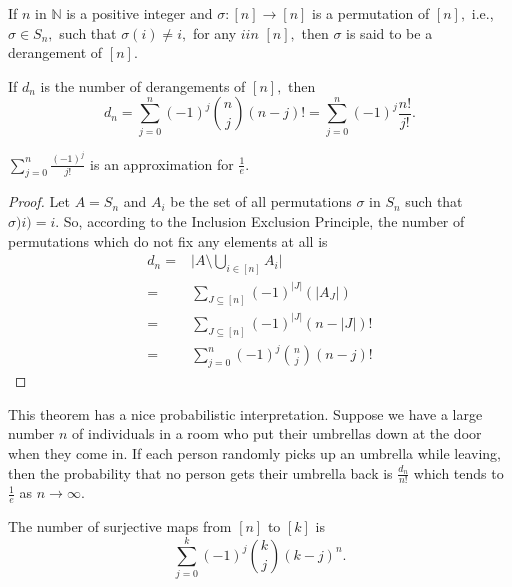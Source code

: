 
\begin{definition}[Derangements]
	If $n$ in $\mathbb{N}$ is a positive integer and $\sigma \colon [n] \to [n]$ is a permutation of $[n],$ i.e., $\sigma \in S_n,$ such that
	$\sigma(i) \not = i,$ for any $i in $ $[n],$ then $\sigma$
	is said to be a derangement of $[n].$
\end{definition}
\begin{theorem}
	If $d_n$ is the number of derangements of $[n],$ then
	$$ d_n = \sum_{j=0}^{n}  (-1)^j \binom{n}{j} (n-j)!
	= \sum_{j=0}^{n} (-1)^j \frac{n!}{j!} .$$
\end{theorem}

\begin{remark}
	$\sum_{j=0}^{n} \frac{(-1)^j}{j!} $ is an approximation for 
	$ \frac{1}{e}.$
\end{remark}

\begin{proof}
	Let $A = S_n$ and $A_i$ be the set of all permutations $\sigma$
	in $S_n$ such that $\sigma)i) = i.$ So, according to  the Inclusion Exclusion Principle, the number of permutations which do not fix any elements at all is
	\begin{align*}
		d_n = {}& \lvert A \setminus \bigcup_{i \in [n]} A_i \rvert \\
		={}& \sum_{J \subseteq [n]} (-1)^{ \lvert J \rvert} 
		\left( \lvert A_J \rvert \right) \\
		={}& \sum_{J \subseteq [n]} (-1)^{ \lvert J \rvert} 
		(n - \lvert J \rvert )!\\
		={}& \sum_{j=0}^{n} (-1)^j \binom{n}{j} (n-j)!
	\end{align*}
\end{proof}

This theorem has a nice probabilistic interpretation.
Suppose we have a large number $n$ of individuals in a room who put their 
umbrellas down at the door when they come in. If each person randomly picks up an umbrella while leaving, then the probability that no person gets their umbrella back is $ \frac{d_n}{n!}$ which tends to $ \frac{1}{e}$ as $n \to \infty.$

\begin{theorem}
	The number of surjective maps from $[n]$ to $[k]$ is 
	$$ \sum_{j=0}^{k} (-1)^j \binom{k}{j} (k-j)^n.$$
\end{theorem}

